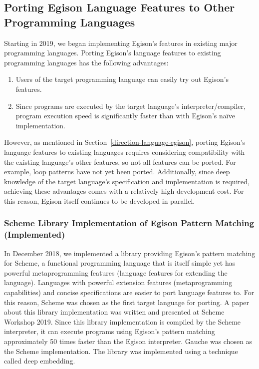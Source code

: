 \subsection{Porting Egison Language Features to Other Programming Languages}\label{direction-language-library}

Starting in 2019, we began implementing Egison's features in existing major programming languages.
Porting Egison's language features to existing programming languages has the following advantages:
\begin{enumerate}
\item Users of the target programming language can easily try out Egison's features.
\item Since programs are executed by the target language's interpreter/compiler, program execution speed is significantly faster than with Egison's na\"ive implementation.
\end{enumerate}
However, as mentioned in Section~\ref{direction-language-egison}, porting Egison's language features to existing languages requires considering compatibility with the existing language's other features, so not all features can be ported.
For example, loop patterns have not yet been ported.
Additionally, since deep knowledge of the target language's specification and implementation is required, achieving these advantages comes with a relatively high development cost.
For this reason, Egison itself continues to be developed in parallel.

\subsubsection{Scheme Library Implementation of Egison Pattern Matching (Implemented)}\label{direction-language-scheme}

In December 2018, we implemented a library providing Egison's pattern matching for Scheme, a functional programming language that is itself simple yet has powerful metaprogramming features (language features for extending the language).
Languages with powerful extension features (metaprogramming capabilities) and concise specifications are easier to port language features to.
For this reason, Scheme was chosen as the first target language for porting.
A paper about this library implementation was written and presented at Scheme Workshop 2019.
Since this library implementation is compiled by the Scheme interpreter, it can execute programs using Egison's pattern matching approximately 50 times faster than the Egison interpreter.
Gauche was chosen as the Scheme implementation.
The library was implemented using a technique called deep embedding.

